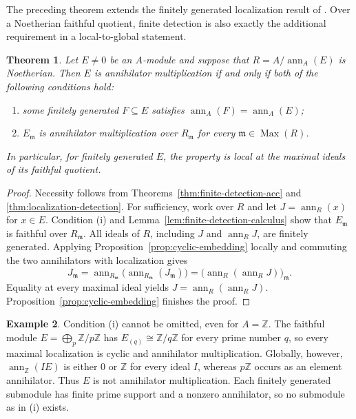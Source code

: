 \documentclass[11pt]{amsart}
\theoremstyle{plain}
\newtheorem{theorem}{Theorem}[section]
\theoremstyle{definition}
\newtheorem{example}[theorem]{Example}
\theoremstyle{remark}
\DeclareMathOperator{\Max}{Max}
\newcommand{\ann}{\operatorname{ann}}
\numberwithin{equation}{section}
\begin{document}
The preceding theorem extends the finitely generated localization result
of \cite[Proposition~3]{KocAMM}. Over a Noetherian faithful quotient,
finite detection is also exactly the additional requirement in a
local-to-global statement.

\begin{theorem}\label{thm:noetherian-local-global}
Let $E\ne0$ be an $A$-module and suppose that
$R=A/\ann_A(E)$ is Noetherian. Then $E$ is annihilator multiplication
if and only if both of the following conditions hold:
\begin{enumerate}[label=\textup{(\roman*)}]
\item some finitely generated $F\subseteq E$ satisfies
$\ann_A(F)=\ann_A(E)$;
\item $E_{\mathfrak m}$ is annihilator multiplication over
$R_{\mathfrak m}$ for every $\mathfrak m\in\Max(R)$.
\end{enumerate}
In particular, for finitely generated $E$, the property is local at the
maximal ideals of its faithful quotient.
\end{theorem}

\begin{proof}
Necessity follows from Theorems~\ref{thm:finite-detection-acc} and
\ref{thm:localization-detection}.
For sufficiency, work over $R$ and let $J=\ann_R(x)$ for $x\in E$.
Condition (i) and Lemma~\ref{lem:finite-detection-calculus} show that
$E_{\mathfrak m}$ is faithful over $R_{\mathfrak m}$.
All ideals of $R$, including $J$ and $\ann_R J$, are finitely generated.
Applying Proposition~\ref{prop:cyclic-embedding} locally and commuting
the two annihilators with localization gives
\[
 J_{\mathfrak m}
 =\ann_{R_{\mathfrak m}}\bigl(\ann_{R_{\mathfrak m}}
         (J_{\mathfrak m})\bigr)
 =\bigl(\ann_R(\ann_R J)\bigr)_{\mathfrak m}.
\]
Equality at every maximal ideal yields $J=\ann_R(\ann_R J)$.
Proposition~\ref{prop:cyclic-embedding} finishes the proof.
\end{proof}

\begin{example}\label{ex:local-global-obstruction}
Condition (i) cannot be omitted, even for $A=\mathbb Z$.
The faithful module $E=\bigoplus_p\mathbb Z/p\mathbb Z$ has
$E_{(q)}\cong\mathbb Z/q\mathbb Z$ for every prime number $q$,
so every maximal localization is cyclic and annihilator multiplication.
Globally, however, $\ann_{\mathbb Z}(IE)$ is either $0$ or $\mathbb Z$
for every ideal $I$, whereas $p\mathbb Z$ occurs as an element
annihilator. Thus $E$ is not annihilator multiplication.
Each finitely generated submodule has finite prime support and a nonzero
annihilator, so no submodule as in (i) exists.
\end{example}
\end{document}
